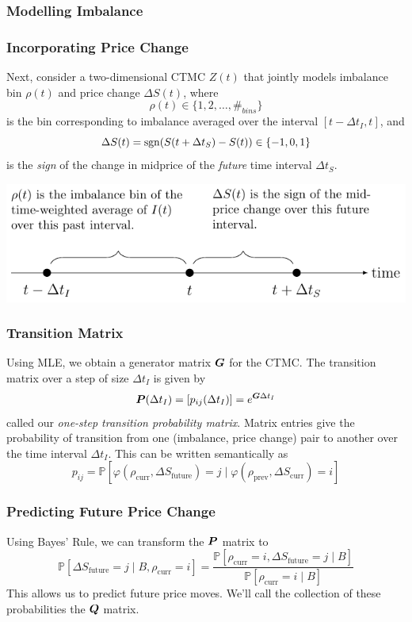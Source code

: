 \begin{frame}
\frametitle{Modelling Imbalance}

\end{frame}

\begin{frame}
\frametitle{Incorporating Price Change}
Next, consider a two-dimensional CTMC $Z(t)$ that jointly models imbalance bin $\rho(t)$ and price change $\Delta S(t)$, where 
\[ \rho(t) \in \lbrace 1,2,\dots,\#_{bins} \rbrace \]
is the bin corresponding to imbalance averaged over the interval $[t-\Delta t_I, t]$, and
\[ \Delta S(t) = \operatorname{\mathrm{sgn}}(S(t+\Delta t_S)-S(t)) \in \lbrace -1, 0, 1 \rbrace \]  
is the \emph{sign} of the change in midprice of the \emph{future} time interval $\Delta t_S$.

\includegraphics[scale=1]{frames/figs/timewindows.pdf}
\end{frame}

\begin{frame}
\frametitle{Transition Matrix}
Using MLE, we obtain a generator matrix $\boldsymbol{G}$ for the CTMC. The transition matrix over a step of size $\Delta t_I$ is given by
\[ \boldsymbol{P}(\Delta t_I) = [p_{ij}(\Delta t_I)] = e^{\boldsymbol{G} \Delta t_I} \]
called our \emph{one-step transition probability matrix}. Matrix entries give the probability of transition from one (imbalance, price change) pair to another over the time interval $\Delta t_I$. This can be written semantically as
\[ p_{ij} = \mathbb{P}\left[ \varphi( \rho_\text{curr}, \Delta S_\text{future}) = j \; | \; \varphi( \rho_\text{prev}, \Delta S_\text{curr} ) = i \right] \]
\end{frame}

\begin{frame}
\frametitle{Predicting Future Price Change}
Using Bayes' Rule, we can transform the $\boldsymbol{P}$ matrix to 
\[ \mathbb{P}\left[ \Delta S_\text{future} = j \; | \; B, \rho_\text{curr} = i \right] = \dfrac{\mathbb{P}\left[ \rho_\text{curr} = i, \Delta S_\text{future} = j \; | \; B \right]}{\mathbb{P}\left[ \rho_\text{curr} = i \; | \; B \right]} \]
This allows us to predict future price moves.
\vspace{\baselineskip}
We'll call the collection of these probabilities the $\boldsymbol{Q}$ matrix.
\end{frame}

